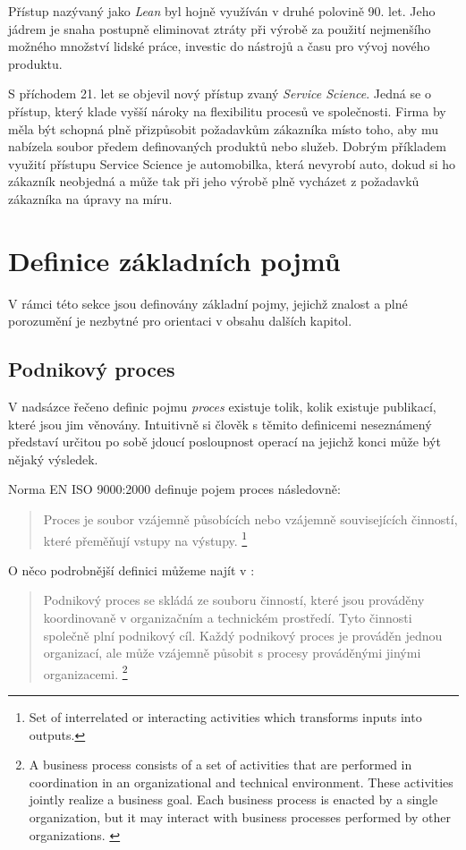 \documentclass[]{article}
\begin{document}
Přístup nazývaný jako \textit{Lean} byl hojně využíván v druhé polovině 90. let. Jeho jádrem je snaha postupně eliminovat ztráty při výrobě za použití nejmenšího možného množství lidské práce, investic do nástrojů a času pro vývoj nového produktu.

S příchodem 21. let se objevil nový přístup zvaný \textit{Service Science}. Jedná se o přístup, který klade vyšší nároky na flexibilitu procesů ve společnosti. Firma by měla být schopná plně přizpůsobit požadavkům zákazníka místo toho, aby mu nabízela soubor předem definovaných produktů nebo služeb. Dobrým příkladem využití přístupu Service Science je automobilka, která nevyrobí auto, dokud si ho zákazník neobjedná a může tak při jeho výrobě plně vycházet z požadavků zákazníka na úpravy na míru.

\section{Definice základních pojmů}
V rámci této sekce jsou definovány základní pojmy, jejichž znalost a plné porozumění je nezbytné pro orientaci v obsahu dalších kapitol.

\subsection{Podnikový proces}
V nadsázce řečeno definic pojmu \textit{proces} existuje tolik, kolik existuje publikací, které jsou jim věnovány. Intuitivně si člověk s těmito definicemi neseznámený představí určitou po sobě jdoucí posloupnost operací na jejichž konci může být nějaký výsledek.

Norma EN ISO 9000:2000 definuje pojem proces následovně: \cite{iso_9000}

\begin{quote}
Proces je soubor vzájemně působících nebo vzájemně souvisejících činností, které přeměňují vstupy na výstupy.
\footnote{Set of interrelated or interacting activities which transforms inputs into outputs.}
\end{quote}

O něco podrobnější definici můžeme najít v \cite{Weske2007}:

\begin{quote}
Podnikový proces se skládá ze souboru činností, které jsou prováděny koordinovaně v organizačním a technickém prostředí. Tyto činnosti společně plní podnikový cíl. Každý podnikový proces je prováděn jednou organizací, ale může vzájemně působit s procesy prováděnými jinými organizacemi.
\footnote{A business process consists of a set of activities that are performed in coordination in an organizational and technical environment. These activities jointly realize a business goal. Each business process is enacted by a single organization, but it may interact with business processes performed by other organizations. \cite{Weske2007}}
\end{quote}
\end{document}
